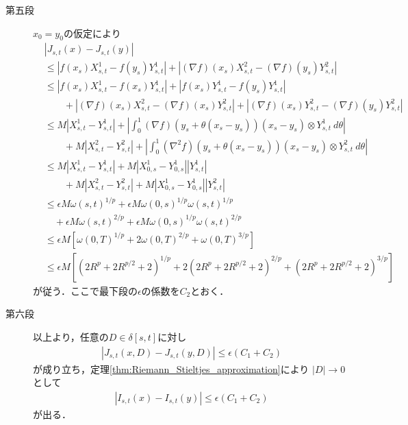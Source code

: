 \begin{prf}
\begin{description}
			\item[第五段]
				$x_0 = y_0$の仮定により
				\begin{align}
					&\left| J_{s,t}(x) - J_{s,t}(y) \right| \\
					&\leq \left| f(x_s)X^1_{s,t} - f(y_s)Y^1_{s,t} \right| + \left| (\nabla f)(x_s)X^2_{s,t} - (\nabla f)(y_s)Y^2_{s,t} \right| \\
					&\leq \left| f(x_s)X^1_{s,t} - f(x_s)Y^1_{s,t} \right|
						+ \left| f(x_s)Y^1_{s,t} - f(y_s)Y^1_{s,t} \right| \\
						&\qquad + \left| (\nabla f)(x_s)X^2_{s,t} - (\nabla f)(x_s)Y^2_{s,t} \right|
						+ \left| (\nabla f)(x_s)Y^2_{s,t} - (\nabla f)(y_s)Y^2_{s,t} \right| \\
					&\leq M \left| X^1_{s,t} - Y^1_{s,t} \right|
						+ \left| \int_0^1 (\nabla f)(y_s + \theta(x_s - y_s))(x_s - y_s) \otimes Y^1_{s,t}\ d\theta \right| \\
						&\qquad + M \left| X^2_{s,t} - Y^2_{s,t} \right|
						+ \left| \int_0^1 (\nabla^2 f)(y_s + \theta(x_s - y_s))(x_s - y_s) \otimes Y^2_{s,t}\ d\theta \right| \\
					&\leq M \left| X^1_{s,t} - Y^1_{s,t} \right|
						+ M \left| X^1_{0,s} - Y^1_{0,s}\right| \left| Y^1_{s,t} \right| \\
						&\qquad + M \left| X^2_{s,t} - Y^2_{s,t} \right| 
						+ M \left| X^1_{0,s} - Y^1_{0,s}\right| \left| Y^2_{s,t} \right| \\
					&\leq \epsilon M \omega(s,t)^{1/p} + \epsilon M \omega(0,s)^{1/p} \omega(s,t)^{1/p} \\
						&\quad + \epsilon M \omega(s,t)^{2/p} + \epsilon M \omega(0,s)^{1/p} \omega(s,t)^{2/p} \\
					&\leq \epsilon M \left[ \omega(0,T)^{1/p} + 2\omega(0,T)^{2/p} + \omega(0,T)^{3/p} \right] \\
					&\leq \epsilon M \left[ \left( 2 R^p + 2R^{p/2} + 2 \right)^{1/p}
						+ 2\left( 2 R^p + 2R^{p/2} + 2 \right)^{2/p}
						+\left( 2 R^p + 2R^{p/2} + 2 \right)^{3/p} \right]
				\end{align}
				が従う．ここで最下段の$\epsilon$の係数を$C_2$とおく．
				
			\item[第六段]
				以上より，任意の$D \in \delta[s,t]$に対し
				\begin{align}
					\left| J_{s,t}(x,D) - J_{s,t}(y,D) \right|
					\leq \epsilon (C_1 + C_2)
				\end{align}
				が成り立ち，定理\ref{thm:Riemann_Stieltjes_approximation}により
				$|D| \longrightarrow 0$として
				\begin{align}
					\left| I_{s,t}(x) - I_{s,t}(y) \right|
					\leq \epsilon (C_1 + C_2)
				\end{align}
				が出る．
				\QED
		\end{description}
	\end{prf}
	
